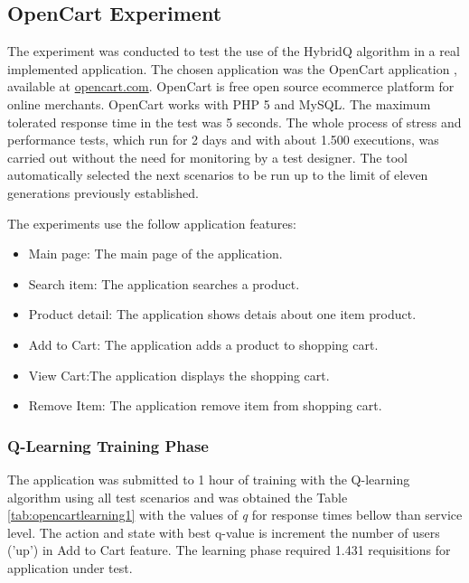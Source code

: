 \documentclass{report}
\begin{document}
\subsection{OpenCart Experiment}

The experiment was conducted to test the use of the HybridQ algorithm in a real implemented application.  The chosen application was the OpenCart application , available at \url{opencart.com}. OpenCart is free open source ecommerce platform for online merchants. OpenCart works with PHP 5 and MySQL. The maximum tolerated response time in the test was 5 seconds. The whole process of stress and performance tests, which run for 2 days and  with about 1.500 executions, was carried out without the need for monitoring by a test designer. The tool automatically selected the next scenarios to be run up to the limit of eleven generations previously established.

The experiments use the follow application features:

\begin{itemize}
\item Main page: The main page of the application.
\item Search item: The application searches a product.
\item Product detail: The application shows  detais about one item product.
\item Add to Cart: The application adds a product to shopping cart.
\item View Cart:The application displays the shopping cart.
\item Remove Item: The application remove item from shopping cart.
\end{itemize}

\subsubsection{Q-Learning Training Phase}

The application was submitted to 1 hour of training with the  Q-learning algorithm using all test scenarios  and was obtained the Table \ref{tab:opencartlearning1} with the values of \textit{q}  for response times bellow than service level. The action and state with best q-value is increment the number of users ('up') in Add to Cart feature. The learning phase required 1.431 requisitions for application under test.
\end{document}
